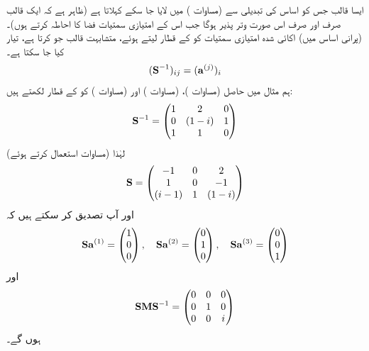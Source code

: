 ایسا قالب جس کو اساس کی تبدیلی سے    (مساوات )   میں لایا جا سکے     کہلاتا ہے (ظاہر ہے کہ  ایک قالب  صرف اور صرف  اس صورت   وتر پذیر   ہوگا جب اس کے امتیازی سمتیات فضا کا احاطہ کرتے ہوں)۔   (پرانی اساس میں)  اکائی شدہ امتیازی سمتیات  کو  کے قطار لیتے ہوئے،   متشابہت قالب جو   کرتا  ہے،  تیار کیا جا سکتا ہے۔
\begin{align}
	(\operatorname{\mathbf{S}}^{-1})_{ij} = (\operatorname{\mathbf{a}}^{(j)})_i
\end{align}
ہم  مثال   میں حاصل   (مساوات )،   (مساوات ) اور   (مساوات ) کو  کے قطار لکھتے ہیں:
\begin{align*}
	\operatorname{\mathbf{S}}^{-1} =
	\begin{pmatrix}
		1 & 2 & 0\\
		0 & (1-i) & 1\\
		1 & 1 & 0
	\end{pmatrix}
\end{align*}
لہٰذا     (مساوات   استعمال کرتے ہوئے)
\begin{align*}
	\operatorname{\mathbf{S}}=
	\begin{pmatrix}
		-1 & 0 & 2\\
		1 & 0 & -1\\
		(i-1) & 1 & (1-i)
	\end{pmatrix}
\end{align*}
اور آپ تصدیق کر سکتے ہیں کہ
\begin{align*}
	\operatorname{\mathbf{Sa}}^{(1)}=
	\begin{pmatrix}
		1\\0\\0
	\end{pmatrix}
	,\quad
	\operatorname{\mathbf{Sa}}^{(2)}=
	\begin{pmatrix}
		0\\1\\0
	\end{pmatrix}
	,\quad
	\operatorname{\mathbf{Sa}}^{(3)}=
	\begin{pmatrix}
		0\\0\\1
	\end{pmatrix}
\end{align*}
اور
\begin{align*}
	\operatorname{\mathbf{SMS}}^{-1}=
	\begin{pmatrix}
		0 & 0 & 0\\
		0 & 1 & 0\\
		0 & 0 & i
	\end{pmatrix}
\end{align*}
ہوں گے۔


